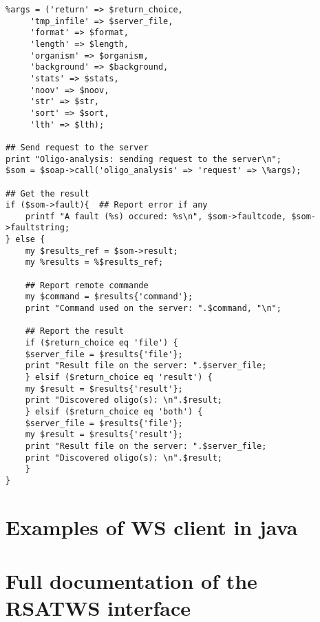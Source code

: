 \begin{footnotesize}
\begin{verbatim}
%args = ('return' => $return_choice, 
	 'tmp_infile' => $server_file, 
	 'format' => $format,
	 'length' => $length,
	 'organism' => $organism, 
	 'background' => $background,
	 'stats' => $stats,
	 'noov' => $noov,
	 'str' => $str,
	 'sort' => $sort,
	 'lth' => $lth);

## Send request to the server
print "Oligo-analysis: sending request to the server\n";
$som = $soap->call('oligo_analysis' => 'request' => \%args);

## Get the result
if ($som->fault){  ## Report error if any
    printf "A fault (%s) occured: %s\n", $som->faultcode, $som->faultstring;
} else {
    my $results_ref = $som->result;
    my %results = %$results_ref;
    
    ## Report remote commande
    my $command = $results{'command'};
    print "Command used on the server: ".$command, "\n";
    
    ## Report the result
    if ($return_choice eq 'file') {
	$server_file = $results{'file'};
	print "Result file on the server: ".$server_file;
    } elsif ($return_choice eq 'result') {
	my $result = $results{'result'};
	print "Discovered oligo(s): \n".$result;
    } elsif ($return_choice eq 'both') {
	$server_file = $results{'file'};
	my $result = $results{'result'};
	print "Result file on the server: ".$server_file;
	print "Discovered oligo(s): \n".$result;
    }
}
\end{verbatim}
\end{footnotesize}

\section{Examples of WS client in java}


\section{Full documentation of the RSATWS interface}

